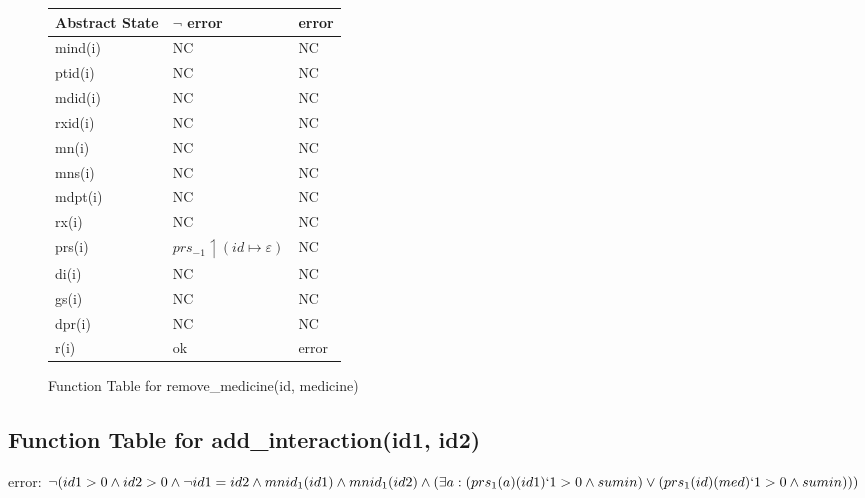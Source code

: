 \begin{figure}[h]
\begin{center}
\begin{tabular}{|l|l|l|}
\hline
Abstract State & $\neg$ error & error \\ \hline
mind(i)        &    NC       & NC    \\ \hline
ptid(i)        &      NC     & NC    \\ \hline
mdid(i)        &    NC       & NC    \\ \hline
rxid(i)        &      NC     & NC    \\ \hline
mn(i)          &     NC      & NC    \\ \hline
mns(i)         &    NC       & NC    \\ \hline
mdpt(i)        &    NC       & NC    \\ \hline
rx(i)          &       NC    & NC    \\ \hline
prs(i)         &      $prs_{-1} \upharpoonleft (id \mapsto \varepsilon)$     & NC    \\ \hline
di(i)          &       NC   & NC    \\ \hline
gs(i)          &      NC     & NC    \\ \hline
dpr(i)         &      NC     & NC    \\ \hline
r(i)           & ok        & error \\ \hline
\end{tabular}
\caption{Function Table for remove\_medicine(id, medicine)}
\label{ft-rm}
\end{center}
\end{figure}

\newpage

\subsection{Function Table for add\_interaction(id1, id2)}

error: $\neg (id1 > 0 \wedge id2 > 0 \wedge \neg id1 = id2 \wedge mnid_{1}(id1)  \wedge mnid_{1}(id2) \wedge (\exists a: (prs_{1}(a)(id1)`1 > 0 \wedge sumin ) \vee (prs_{1}(id)(med)`1 > 0 \wedge sumin)))$

